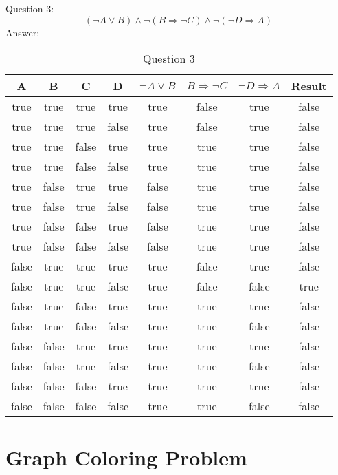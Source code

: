 \documentclass[12pt, a4paper]{report}
\begin{document}
Question 3:
\begin{equation}
    (\neg A \vee B) \wedge \neg (B \Rightarrow \neg C) \wedge \neg (\neg D \Rightarrow A)
\end{equation}
Answer:
\begin{table}[h]
    \centering
    \caption{Question 3}
    \begin{tabular}{|c|c|c|c|c|c|c|c|}
    \hline
    A & B & C & D & $\neg A \vee B$ & $B \Rightarrow \neg C$ & $\neg D \Rightarrow A$ & Result \\
    \hline
    true & true & true & true & true & false & true & false \\
    \hline
    true & true & true & false & true & false & true & false \\
    \hline
    true & true & false & true & true & true & true & false \\
    \hline
    true & true & false & false & true & true & true & false \\
    \hline
    true & false & true & true & false & true & true & false \\
    \hline
    true & false & true & false & false & true & true & false \\
    \hline
    true & false & false & true & false & true & true & false \\
    \hline
    true & false & false & false & false & true & true & false \\
    \hline
    false & true & true & true & true & false & true & false \\
    \hline
    false & true & true & false & true & false & false & true \\
    \hline
    false & true & false & true & true & true & true & false \\
    \hline
    false & true & false & false & true & true & false & false \\
    \hline
    false & false & true & true & true & true & true & false \\
    \hline
    false & false & true & false & true & true & false & false \\
    \hline
    false & false & false & true & true & true & true & false \\
    \hline
    false & false & false & false & true & true & false & false \\
    \hline
    \end{tabular}
\end{table}


\section{Graph Coloring Problem}
\end{document}
